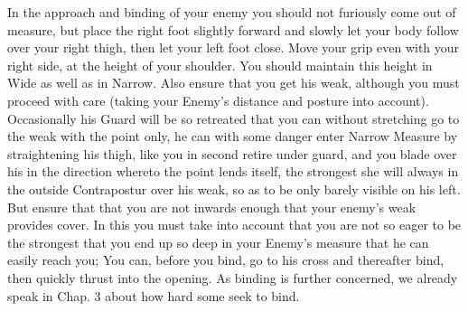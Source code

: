 In the approach and binding of your enemy you should not furiously
come out of measure, but place the right foot slightly forward and
slowly let your body follow over your right thigh, then let your left
foot close. Move your grip even with your right side, at the
height of your shoulder. You should maintain this height in Wide as
well as in Narrow. Also ensure that you get his weak, although you
must proceed with care (taking your Enemy's distance and posture into
account). Occasionally his Guard will be so retreated that you can without
stretching go  to the weak with the point only, he can
with some danger enter Narrow Measure by straightening his thigh, like
you in second retire under guard, and you blade over his in the
direction whereto the point lends itself, the strongest  she will
always in the outside Contrapostur over his weak, so as to be only
barely visible on his left. But ensure that that you are not inwards
enough that your enemy's weak provides cover. In this you must take
into account that you are not so eager to be the strongest that you end up so deep in your Enemy's measure that he can
easily reach you; You can, before you bind, go to his cross and
thereafter bind, then quickly thrust into the opening. As binding is
further concerned, we already speak in Chap. 3 about how hard
some seek to bind.


